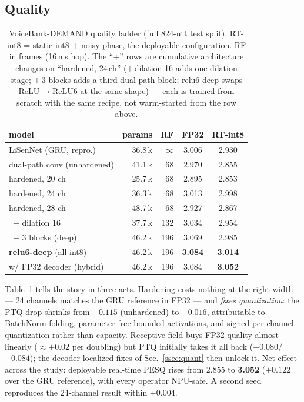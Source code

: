 \documentclass{article}
\begin{document}
\subsection{Quality}
\label{ssec:quality}

\begin{table}[t]
  \centering
  \caption{VoiceBank-DEMAND quality ladder (full 824-utt test split). RT-int8
  = static int8 + noisy phase, the deployable configuration. RF in frames
  (16\,ms hop). The ``$+$'' rows are cumulative architecture changes on
  ``hardened, 24\,ch'' ($+$\,dilation 16 adds one dilation stage;
  $+$\,3 blocks adds a third dual-path block; relu6-deep swaps ReLU$\to$ReLU6
  at the same shape) --- each is trained from scratch with the same recipe,
  not warm-started from the row above.}
  \label{tab:quality}
  \small
  \begin{tabular}{@{}lrrcc@{}}
    \toprule
    model & params & RF & FP32 & RT-int8 \\
    \midrule
    LiSenNet (GRU, repro.)~\cite{yan2024lisennet} & 36.8\,k & $\infty$ & 3.006 & 2.930 \\
    dual-path conv (unhardened)        & 41.1\,k & 68  & 2.970 & 2.855 \\
    \midrule
    hardened, 20 ch                    & 25.7\,k & 68  & 2.895 & 2.853 \\
    hardened, 24 ch                    & 36.3\,k & 68  & 3.013 & 2.998 \\
    hardened, 28 ch                    & 48.7\,k & 68  & 2.927 & 2.867 \\
    \midrule
    ~+ dilation 16                     & 37.7\,k & 132 & 3.034 & 2.954 \\
    ~+ 3 blocks (deep)                 & 46.2\,k & 196 & 3.069 & 2.985 \\
    \textbf{relu6-deep} (all-int8)     & 46.2\,k & 196 & \textbf{3.084} & \textbf{3.014} \\
    \quad w/ FP32 decoder (hybrid)     & 46.2\,k & 196 & 3.084 & \textbf{3.052} \\
    \bottomrule
  \end{tabular}
\end{table}

Table~\ref{tab:quality} tells the story in three acts. Hardening costs
nothing at the right width --- 24 channels matches the GRU reference in FP32
--- and \emph{fixes quantization}: the PTQ drop shrinks from $-0.115$
(unhardened) to $-0.016$, attributable to BatchNorm folding, parameter-free
bounded activations, and signed per-channel quantization rather than
capacity. Receptive field buys FP32 quality almost linearly
($\approx+0.02$ per doubling) but PTQ initially takes it all back
($-0.080$/$-0.084$); the decoder-localized fixes of Sec.~\ref{ssec:quant}
then unlock it. Net effect across the study: deployable real-time PESQ rises
from 2.855 to \textbf{3.052} ($+0.122$ over the GRU reference), with every
operator NPU-safe. A second seed reproduces the 24-channel result within
$\pm0.004$.
\end{document}
